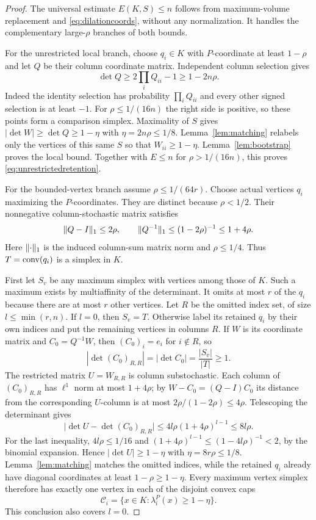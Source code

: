\begin{proof}
The universal estimate $E(K,S)\le n$ follows from maximum-volume
replacement and \eqref{eq:dilationcoords}, without any normalization.
It handles the complementary large-$\rho$ branches of both bounds.

For the unrestricted local branch, choose $q_i\in K$ with $P$-coordinate
at least $1-\rho$ and let $Q$ be their column coordinate matrix. Independent
column selection gives
\[
 \det Q\ge2\prod_iQ_{ii}-1\ge1-2n\rho.
\]
Indeed the identity selection has probability $\prod_iQ_{ii}$ and every
other signed selection is at least $-1$. For $\rho\le1/(16n)$ the right
side is positive, so these points form a comparison simplex. Maximality of
$S$ gives $|\det W|\ge\det Q\ge1-\eta$ with $\eta=2n\rho\le1/8$.
Lemma~\ref{lem:matching} relabels only the vertices of this same $S$ so
that $W_{ii}\ge1-\eta$. Lemma~\ref{lem:bootstrap} proves the local bound.
Together with $E\le n$ for $\rho>1/(16n)$, this proves
\eqref{eq:unrestrictedretention}.

For the bounded-vertex branch assume $\rho\le1/(64r)$. Choose actual
vertices $q_i$ maximizing the $P$-coordinates. They are distinct because
$\rho<1/2$. Their nonnegative column-stochastic matrix satisfies
\begin{equation}\label{eq:Qinverse}
 \lVert Q-I\rVert_1\le2\rho,
 \qquad \lVert Q^{-1}\rVert_1\le(1-2\rho)^{-1}\le1+4\rho.
\end{equation}
Here $\lVert \cdot\rVert_1$ is the induced column-sum matrix norm and
$\rho\le1/4$. Thus $T=\operatorname{conv}(q_i)$ is a simplex in $K$.

First let $S_v$ be any maximum simplex with vertices among those of $K$.
Such a maximum exists by multiaffinity of the determinant. It omits at most
$r$ of the $q_i$ because there are at most $r$ other vertices. Let $R$ be
the omitted index set, of size $l\le\min(r,n)$. If $l=0$, then $S_v=T$.
Otherwise label its retained $q_i$ by their own indices and put the remaining
vertices in columns $R$. If $W$ is its coordinate matrix and $C_0=Q^{-1}W$,
then $(C_0)_i=e_i$ for $i\notin R$, so
\[
 |\det (C_0)_{R,R}|=|\det C_0|=\frac{|S_v|}{|T|}\ge1.
\]
The restricted matrix $U=W_{R,R}$ is column substochastic. Each column of
$(C_0)_{R,R}$ has $\ell^1$ norm at most $1+4\rho$; by
$W-C_0=(Q-I)C_0$ its distance from the corresponding $U$-column is at most
$2\rho/(1-2\rho)\le4\rho$. Telescoping the determinant gives
\[
 \bigl|\det U-\det(C_0)_{R,R}\bigr|
 \le4l\rho(1+4\rho)^{l-1}\le8l\rho.
\]
For the last inequality, $4l\rho\le1/16$ and
$(1+4\rho)^{l-1}\le(1-4l\rho)^{-1}<2$, by the binomial expansion.
Hence $|\det U|\ge1-\eta$ with $\eta=8r\rho\le1/8$.
Lemma~\ref{lem:matching} matches the omitted indices, while the retained
$q_i$ already have diagonal coordinates at least $1-\rho\ge1-\eta$.
Every maximum vertex simplex therefore has exactly one vertex in each of
the disjoint convex caps
\begin{equation}\label{eq:disjointcaps}
 \mathcal C_i=\{x\in K:\lambda_i^P(x)\ge1-\eta\}.
\end{equation}
This conclusion also covers $l=0$.


\end{proof}

